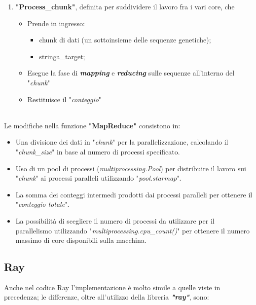 \documentclass{article}
\begin{document}
    \begin{enumerate}
        \item \textbf{"Process\_chunk"}, definita per suddividere il lavoro fra i vari core, che
        \begin{itemize}
            \item Prende in ingresso:
            \begin{itemize}
                \item chunk di dati (un sottoinsieme delle sequenze genetiche);
                \item stringa\_target;
            \end{itemize}
        \item Esegue la fase di \textbf{\textit{mapping}} e \textbf{\textit{reducing}} sulle sequenze all'interno del "\textit{chunk}"
        \item Restituisce il "\textit{conteggio}"
        \end{itemize}
    \end{enumerate}
    \\Le modifiche nella funzione \textbf{"MapReduce"} consistono in:
    \begin{itemize}
        \item Una divisione dei dati in "\textit{chunk}" per la parallelizzazione, calcolando il "\textit{chunk\_size}" in base al numero di processi specificato.
        \item Uso di un pool di processi (\textit{multiprocessing.Pool}) per distribuire il lavoro sui "\textit{chunk}" ai processi paralleli utilizzando "\textit{pool.starmap}".
        \item La somma dei conteggi intermedi prodotti dai processi paralleli per ottenere il "\textit{conteggio totale}".
        \item La possibilità di scegliere il numero di processi da utilizzare per il parallelismo utilizzando "\textit{multiprocessing.cpu\_count()}" per ottenere il numero massimo di core disponibili sulla macchina.
    \end{itemize}
    
    \vspace{10pt}
    
    

    \vspace{5pt}
    
    \subsection{Ray}
    Anche nel codice Ray l'implementazione è molto simile a quelle viste in precedenza; le differenze, oltre all'utilizzo della libreria \textbf{\textit{"ray"}}, sono:
\end{document}
